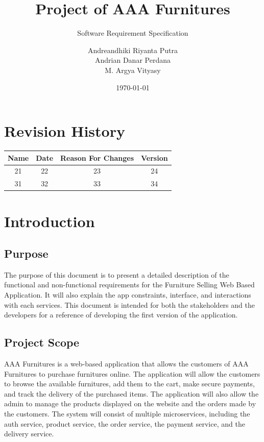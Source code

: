 \documentclass[oneside,a4paper,12pt,explicit]{book}
\title{Project of AAA Furnitures}
\subtitle{Software Requirement Specification}
\date{\today}
\author{Andreandhiki Riyanta Putra\\Andrian Danar Perdana\\M. Argya Vityasy}
\begin{document}
\maketitle
\large
\tableofcontents
\normalsize
\chapter*{Revision History}

\begin{center}
    \begin{tabular}{|c|c|c|c|}
        \hline
	    Name & Date & Reason For Changes & Version\\
        \hline
	    21 & 22 & 23 & 24\\
        \hline
	    31 & 32 & 33 & 34\\
        \hline
    \end{tabular}
\end{center}

\chapter{Introduction}

\section{Purpose}
The purpose of this document is to present a detailed description of the functional
and non-functional requirements for the Furniture Selling Web Based Application.
It will also explain the app constraints, interface, and interactions with each services.
This document is intended for both the stakeholders and the developers
for a reference of developing the first version of the application.

\section{Project Scope}
AAA Furnitures is a web-based application that allows the customers of AAA Furnitures 
to purchase furnitures online. The application will allow the customers 
to browse the available furnitures, add them to the cart,
make secure payments, and track the delivery of the purchased items.
The application will also allow the admin to manage the products displayed on the website 
and the orders made by the customers.
The system will consist of multiple microservices, including the auth service, product service,
the order service, the payment service, and the delivery service.
\end{document}
